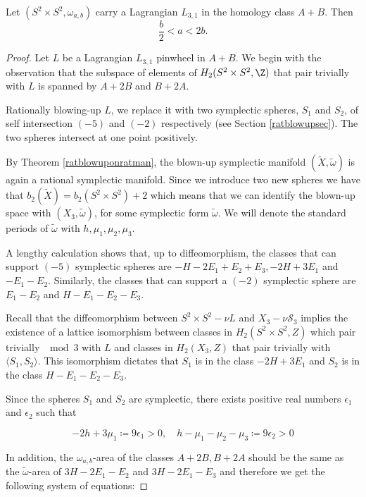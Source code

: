 \begin{proposition}\label{l31nec}
Let $(S^2\times S^2,\omega_{a,b})$ carry a Lagrangian $L_{3,1}$ in the homology class $A+B$. Then
\[\frac{b}{2}<a<2b.\]
\end{proposition}

\begin{proof}
Let $L$ be a Lagrangian $L_{3,1}$ pinwheel in $A+B$. We begin with the observation that the subspace of elements of $H_2(S^2\times S^2,\Z)$ that pair trivially with $L$ is spanned by  $A+2B$ and $B+2A$.\par

Rationally blowing-up $L$, we replace it with two symplectic spheres, $S_1$ and $S_2$, of self intersection $(-5)$ and $(-2)$ respectively (see Section \ref{ratblowupsec}). The two spheres intersect at one point positively.\par 

By Theorem \ref{ratblowuponratman}, the blown-up symplectic manifold $(\widetilde{X},\tilde{\omega})$ is again a rational symplectic manifold. Since we introduce two new spheres we have that $b_2(\widetilde{X})=b_2(S^2\times S^2)+2$ which means that we can identify the blown-up space with $(X_3,\tilde{\omega})$, for some symplectic form $\tilde{\omega}$. We will denote the standard periods of $\tilde{\omega}$ with $h,\mu_1,\mu_2,\mu_3$.\par

A lengthy calculation shows that, up to diffeomorphism, the classes that can support $(-5)$ symplectic spheres are $-H-2E_1+E_2+E_3,-2H+3E_1$ and $-E_1-E_2$. Similarly, the classes that can support a $(-2)$ symplectic sphere are $E_1-E_2$ and $H-E_1-E_2-E_3$. 
\par
Recall that the diffeomorphism between $S^2\times S^2-\nu L$ and $X_3-\nu \mathcal{S}_3$ implies the existence of a lattice isomorphism between classes in $H_2(S^2\times S^2,Z)$ which pair trivially $\mod 3$ with $L$ and classes in $H_2(X_3,Z)$ that pair trivially with $\langle S_1, S_2\rangle$. This isomorphism dictates that $S_1$ is in the class $-2H+3E_1$ and $S_2$ is in the class $H-E_1-E_2-E_3$.\par


Since the spheres $S_1$ and $S_2$ are symplectic, there exists positive real numbers $\epsilon_1$ and $\epsilon_2$ such that

\[
    -2h+3\mu_1\coloneqq 9\epsilon_1>0,\quad h-\mu_1-\mu_2-\mu_3\coloneqq 9\epsilon_2>0
\]

In addition, the $\omega_{a,b}$-area of the classes $A+2B,B+2A$ should be the same as the $\tilde{\omega}$-area of $3H-2E_1-E_2$ and $3H-2E_1-E_3$ and therefore we get the following system of equations:


\end{proof}

